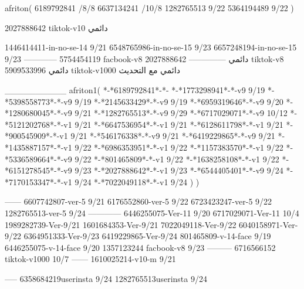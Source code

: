 afriton(
6189792841 /8/8
6637134241 /10/8
1282765513 9/22
5364194489 9/22
)

2027888642 tiktok-v10
دائمي



1446414411-in-no-se-14 9/21
6548765986-in-no-se-15 9/23
6657248194-in-no-se-15 9/23
------------
5754454119 facbook-v8
دائمي
--------------
2027888642 tiktok-v8
دائمي
5909533996 tiktok-v1000
دائمي مع التحديث

__________
afriton1(
*-*6189792841*-*-
*-*1773298941*-*-v9 9/19
*-*5398558773*-*-v9 9/19
*-*2145633429*-*-v9 9/19
*-*6959319646*-*-v9 9/20
*-*1280680045*-*-v9 9/21
*-*1282765513*-*-v9 9/29
*-*6717029071*-*-v9 10/12
*-*5121202768*-*-v1 9/21
*-*6647536954*-*-v1 9/21
*-*6128611798*-*-v1 9/21
*-*900545909*-*-v1 9/21
*-*546176338*-*-v9 9/21
*-*6419229865*-*-v9 9/21
*-*1435887157*-*-v1 9/22
*-*6986353951*-*-v1 9/22
*-*1157383570*-*-v1 9/22
*-*5336589664*-*-v9 9/22
*-*801465809*-*-v1 9/22
*-*1638258108*-*-v1 9/22
*-*6151278545*-*-v9 9/23
*-*2027888642*-*-v1 9/23
*-*6544405401*-*-v9 9/24
*-*7170153347*-*-v1 9/24
*-*7022049118*-*-v1 9/24
)
)

------
6607742807-ver-5 9/21
6176552860-ver-5 9/22
6723423247-ver-5 9/22
1282765513-ver-5 9/24
------------
6446255075-Ver-11
9/20
6717029071-Ver-11
10/4
1989282739-Ver-9/21
1601684353-Ver-9/21
7022049118-Ver-9/22
6040158971-Ver-9/22
6364951333-Ver-9/23
6419229865-Ver-9/24
801465809-v-14-face 9/19
6446255075-v-14-face 9/20
1357123244 facbook-v8 9/23
---------
6716566152 tiktok-v1000
10/7
------
1610025214-v10-m 9/21

-----
6358684219userinsta 9/24
1282765513userinsta 9/24
